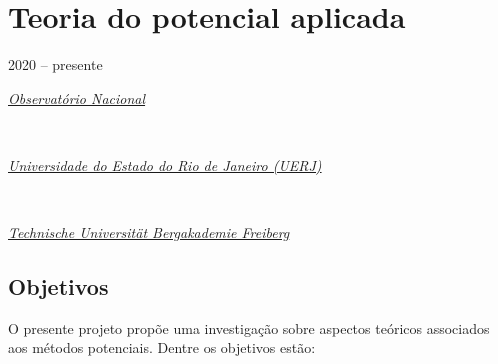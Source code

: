 

\section{Teoria do potencial aplicada} 
\label{sec:projeto-teorico}

2020 -- presente
\vspace{0.3\baselineskip}\\
\noindent\parbox{0.03\textwidth}{\vspace{-0.2\baselineskip}\faUniversity} \href{https://www.gov.br/observatorio/pt-br}{\textsl{Observatório Nacional}}
\parbox{0.03\textwidth}{\vspace{-0.2\baselineskip} \hfill {}} \\
\noindent\parbox{0.03\textwidth}{\vspace{-0.2\baselineskip}\faUniversity}
\href{https://www.uerj.br/}{\textsl{Universidade do Estado do Rio de Janeiro (UERJ)}}
\parbox{0.03\textwidth}{\vspace{-0.2\baselineskip} \hfill {}} \\
\noindent\parbox{0.03\textwidth}{\vspace{-0.2\baselineskip}\faUniversity}
\href{https://tu-freiberg.de/universitaet}{\textsl{Technische Universität Bergakademie Freiberg}}
\parbox{0.04\textwidth}{\vspace{-0.2\baselineskip} \hfill {}}


\subsection*{Objetivos}

O presente projeto propõe uma investigação sobre aspectos teóricos associados aos 
métodos potenciais. Dentre os objetivos estão:

